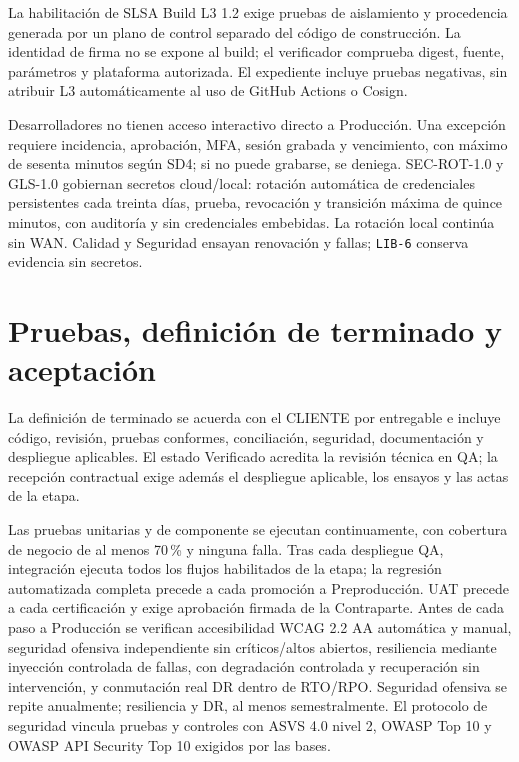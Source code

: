 La habilitación de SLSA Build L3 1.2 exige pruebas de aislamiento y procedencia generada por un plano de control separado del código de construcción. La identidad de firma no se expone al build; el verificador comprueba digest, fuente, parámetros y plataforma autorizada. El expediente incluye pruebas negativas, sin atribuir L3 automáticamente al uso de GitHub Actions o Cosign. \parencites{sd6-slsa,sd6-slsa-requisitos}

Desarrolladores no tienen acceso interactivo directo a Producción. Una excepción requiere incidencia, aprobación, MFA, sesión grabada y vencimiento, con máximo de sesenta minutos según SD4; si no puede grabarse, se deniega. SEC-ROT-1.0 y GLS-1.0 gobiernan secretos cloud/local: rotación automática de credenciales persistentes cada treinta días, prueba, revocación y transición máxima de quince minutos, con auditoría y sin credenciales embebidas. La rotación local continúa sin WAN. Calidad y Seguridad ensayan renovación y fallas; \texttt{LIB-6} conserva evidencia sin secretos. \parencite[RT-04.09, p.~11; RT-11.27, p.~24]{sd6-bt}

\section{Pruebas, definición de terminado y aceptación}
La definición de terminado se acuerda con el CLIENTE por entregable e incluye código, revisión, pruebas conformes, conciliación, seguridad, documentación y despliegue aplicables. El estado Verificado acredita la revisión técnica en QA; la recepción contractual exige además el despliegue aplicable, los ensayos y las actas de la etapa. \parencite[RT-20.07/08, p.~35]{sd6-bt}

Las pruebas unitarias y de componente se ejecutan continuamente, con cobertura de negocio de al menos 70\,\% y ninguna falla. Tras cada despliegue QA, integración ejecuta todos los flujos habilitados de la etapa; la regresión automatizada completa precede a cada promoción a Preproducción. UAT precede a cada certificación y exige aprobación firmada de la Contraparte. Antes de cada paso a Producción se verifican accesibilidad WCAG 2.2 AA automática y manual, seguridad ofensiva independiente sin críticos/altos abiertos, resiliencia mediante inyección controlada de fallas, con degradación controlada y recuperación sin intervención, y conmutación real DR dentro de RTO/RPO. Seguridad ofensiva se repite anualmente; resiliencia y DR, al menos semestralmente. El protocolo de seguridad vincula pruebas y controles con ASVS 4.0 nivel 2, OWASP Top 10 y OWASP API Security Top 10 exigidos por las bases. \parencites[art.~4.3, pp.~5--6]{sd6-ba}[RT-11.20, p.~24; cap.~20, pp.~34--35]{sd6-bt}

